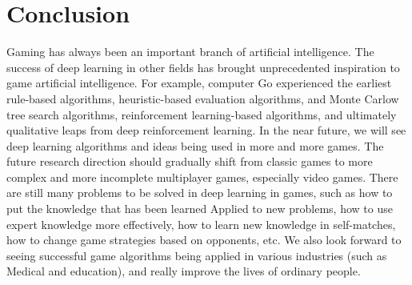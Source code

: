 \documentclass[11pt,en]{elegantpaper}
\begin{document}
\section{Conclusion}
Gaming has always been an important branch of artificial intelligence. The success of deep learning in other fields has brought unprecedented inspiration to game artificial intelligence. For example, computer Go experienced the earliest rule-based algorithms, heuristic-based evaluation algorithms, and Monte Carlow tree search algorithms, reinforcement learning-based algorithms, and ultimately qualitative leaps from deep reinforcement learning. In the near future, we will see deep learning algorithms and ideas being used in more and more games. The future research direction should gradually shift from classic games to more complex and more incomplete multiplayer games, especially video games. There are still many problems to be solved in deep learning in games, such as how to put the knowledge that has been learned Applied to new problems, how to use expert knowledge more effectively, how to learn new knowledge in self-matches, how to change game strategies based on opponents, etc. We also look forward to seeing successful game algorithms being applied in various industries (such as Medical and education), and really improve the lives of ordinary people.



\end{document}
